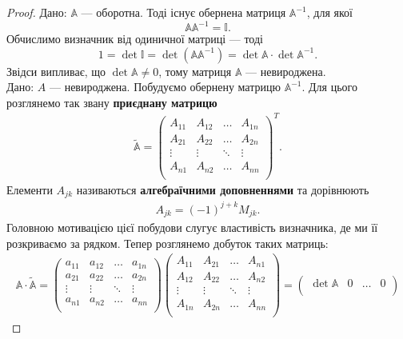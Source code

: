 \documentclass{math_library}
\begin{document}
\begin{proof}
\rightproof Дано: $\mathbb{A}$ --- оборотна. Тоді існує обернена матриця $\mathbb{A}^{-1}$, для якої
\[
\mathbb{A} \mathbb{A}^{-1} = \mathbb{I}.
\]
Обчислимо визначник від одиничної матриці --- тоді
\[
1 = \det \mathbb{I} = \det (\mathbb{A} \mathbb{A}^{-1}) = \det \mathbb{A} \cdot \det \mathbb{A}^{-1}.
\]
Звідси випливає, що $\det \mathbb{A} \neq 0$, тому матриця $\mathbb{A}$ --- невироджена.
\bigskip \\
\leftproof Дано: $A$ --- невироджена. Побудуємо обернену матрицю $\mathbb{A}^{-1}$. Для цього розглянемо так звану \textbf{приєднану матрицю}
\begin{align*}
\widetilde{\mathbb{A}} = \begin{pmatrix}
A_{11} & A_{12} & \dots & A_{1n} \\
A_{21} & A_{22} & \dots & A_{2n} \\
\vdots & \vdots & \ddots & \vdots \\
A_{n1} & A_{n2} & \dots & A_{nn} \\
\end{pmatrix}^T.
\end{align*}
Елементи $A_{jk}$ називаються \textbf{алгебраїчними доповненнями} та дорівнюють
\begin{align*}
A_{jk} = (-1)^{j+k}M_{jk}.
\end{align*}
Головною мотивацією цієї побудови слугує властивість визначника, де ми її розкриваємо за рядком. Тепер розглянемо добуток таких матриць:
\begin{align*}
\mathbb{A} \cdot \widetilde{\mathbb{A}} = \begin{pmatrix}
a_{11} & a_{12} & \dots & a_{1n} \\
a_{21} & a_{22} & \dots & a_{2n} \\
\vdots & \vdots & \ddots & \vdots \\
a_{n1} & a_{n2} & \dots & a_{nn} \\
\end{pmatrix} \begin{pmatrix}
A_{11} & A_{21} & \dots & A_{n1} \\
A_{12} & A_{22} & \dots & A_{n2} \\
\vdots & \vdots & \ddots & \vdots \\
A_{1n} & A_{2n} & \dots & A_{nn} \\
\end{pmatrix} = \begin{pmatrix}
\det \mathbb{A} & 0 & \dots & 0 \\

\end{pmatrix}
\end{align*}
\end{proof}
\end{document}
